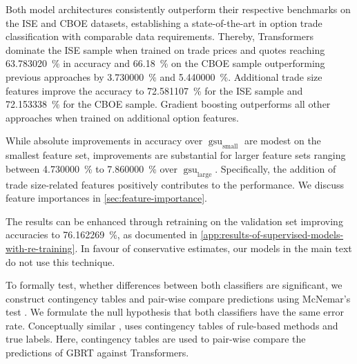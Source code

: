 Both model architectures consistently outperform their respective benchmarks on the \gls{ISE} and \gls{CBOE} datasets, establishing a state-of-the-art in option trade classification with comparable data requirements. Thereby, Transformers dominate the \gls{ISE} sample when trained on trade prices and quotes reaching \SI{63.783020}{\percent}  in accuracy and \SI{66.18}{\percent} on the \gls{CBOE} sample outperforming previous approaches by \SI{3.730000}{\percent} and \SI{5.440000}{\percent}. Additional trade size features improve the accuracy to \SI{72.581107}{\percent} for the \gls{ISE} sample and \SI{72.153338}{\percent} for the \gls{CBOE} sample. Gradient boosting outperforms all other approaches when trained on additional option features.

While absolute improvements in accuracy over $\operatorname{gsu}_{\mathrm{small}}$ are modest on the smallest feature set, improvements are substantial for larger feature sets ranging between \SI{4.730000}{\percent} to \SI{7.860000}{\percent} over $\operatorname{gsu}_{\mathrm{large}}$. Specifically, the addition of trade size-related features positively contributes to the performance. We discuss feature importances in \cref{sec:feature-importance}.

The results can be enhanced through retraining on the validation set improving accuracies to \SI{76.162269}{\percent}, as documented in \cref{app:results-of-supervised-models-with-re-training}. In favour of conservative estimates, our models in the main text do not use this technique.

To formally test, whether differences between both classifiers are significant, we construct contingency tables and pair-wise compare predictions using McNemar's test \autocite[][153--157]{mcnemarNoteSamplingError1947}. We formulate the null hypothesis that both classifiers have the same error rate.
Conceptually similar \textcite[][267]{odders-whiteOccurrenceConsequencesInaccurate2000}, uses contingency tables of rule-based methods and true labels. Here, contingency tables are used to pair-wise compare the predictions of \gls{GBRT} against Transformers.

